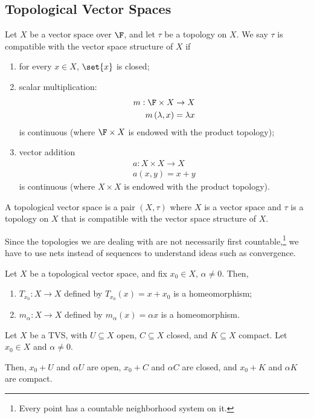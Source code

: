 \documentclass[10pt]{mypackage}
\begin{document}
\subsection{Topological Vector Spaces}%
\begin{definition}
  Let $X$ be a vector space over $\F$, and let $\tau$ be a topology on $X$. We say $\tau$ is compatible with the vector space structure of $X$ if
  \begin{enumerate}[(1)]
    \item for every $x\in X$, $\set{x}$ is closed;
    \item scalar multiplication:
      \begin{align*}
        m: \F\times X\rightarrow X\\
        m\left(\lambda,x\right) = \lambda x
      \end{align*}
      is continuous (where $\F\times X$ is endowed with the product topology);
    \item vector addition
      \begin{align*}
        a: X\times X\rightarrow X\\
        a\left(x,y\right) = x + y
      \end{align*}
      is continuous (where $X\times X$ is endowed with the product topology).
  \end{enumerate}
  A topological vector space is a pair $\left(X,\tau\right)$ where $X$ is a vector space and $\tau$ is a topology on $X$ that is compatible with the vector space structure of $X$.
\end{definition}
\begin{remark}
  Since the topologies we are dealing with are not necessarily first countable,\footnote{Every point has a countable neighborhood system on it.} we have to use nets instead of sequences to understand ideas such as convergence.
\end{remark}
\begin{proposition}
  Let $X$ be a topological vector space, and fix $x_0\in X$, $\alpha \neq 0$. Then,
  \begin{enumerate}[(1)]
    \item $T_{x_0}:X\rightarrow X$ defined by $T_{x_0}\left(x\right) = x + x_0$ is a homeomorphism;
    \item $m_{\alpha}: X\rightarrow X$ defined by $m_{\alpha}\left(x\right) = \alpha x$ is a homeomorphism.
  \end{enumerate}
\end{proposition}
\begin{corollary}
  Let $X$ be a TVS, with $U\subseteq X$ open, $C\subseteq X$ closed, and $K\subseteq X$ compact. Let $x_0\in X$ and $\alpha \neq 0$.\newline

  Then, $x_0 + U$ and $\alpha U$ are open, $x_0 + C$ and $\alpha C$ are closed, and $x_0 + K$ and $\alpha K$ are compact.
\end{corollary}
\end{document}
